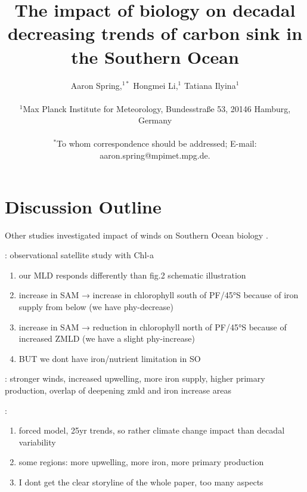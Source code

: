 \documentclass[12pt]{article}
\title{The impact of biology on decadal decreasing trends of carbon sink in the Southern Ocean}
\author
{Aaron Spring,$^{1\ast}$ Hongmei Li,$^{1}$ Tatiana Ilyina$^{1}$\\
\\
\normalsize{$^{1}$Max Planck Institute for Meteorology, Bundesstra{\ss}e 53, 20146 Hamburg, Germany}\\
\\
\normalsize{$^\ast$To whom correspondence should be addressed; E-mail:  aaron.spring@mpimet.mpg.de.}
}
\date{}
\begin{document}
 


\baselineskip18pt




\section{Discussion Outline}

Other studies investigated impact of winds on Southern Ocean biology \citep{Lovenduski2005,Hauck2013}.
 
\citep{Lovenduski2005}: observational satellite study with Chl-a
\begin{enumerate}
\item our MLD responds differently than fig.2 schematic illustration
\item increase in SAM → increase in chlorophyll south of PF/45°S because of iron supply from below (we have phy-decrease)
\item increase in SAM → reduction in chlorophyll north of PF/45°S because of increased ZMLD (we have a slight phy-increase)
\item BUT we dont have iron/nutrient limitation in SO
\end{enumerate} 

\citep{Hauck2013}: stronger winds, increased upwelling, more iron supply, higher primary production, overlap of deepening zmld and iron increase areas

\citep{wang2012}: 
\begin{enumerate}
\item forced model, 25yr trends, so rather climate change impact than decadal variability
\item some regions: more upwelling, more iron, more primary production 
\item I dont get the clear storyline of the whole paper, too many aspects
\end{enumerate}
\end{document}
